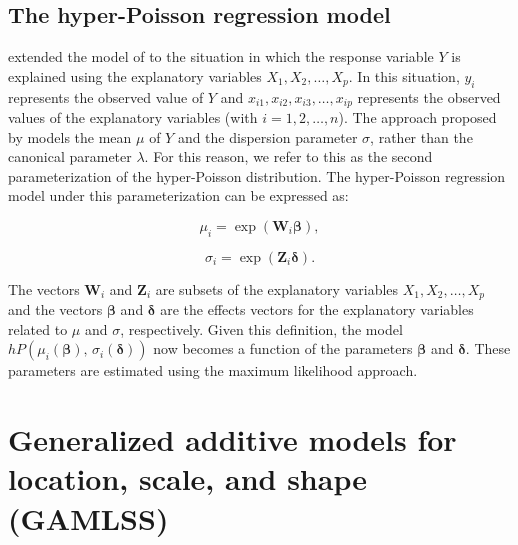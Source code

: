 \subsection{The hyper-Poisson regression model}\label{the-hyper-poisson-regression-model}

\citet{Saez13} extended the model of \citet{BardwellCrow1964} to the situation in which the response variable \(Y\) is explained using the explanatory variables \(X_1, X_2, \ldots, X_p\). In this situation, \(y_i\) represents the observed value of \(Y\) and \(x_{i1}, x_{i2}, x_{i3}, \dots, x_{ip}\) represents the observed values of the explanatory variables (with \(i=1, 2, \ldots, n\)). The approach proposed by \citet{Saez13} models the mean \(\mu\) of \(Y\) and the dispersion parameter \(\sigma\), rather than the canonical parameter \(\lambda\). For this reason, we refer to this as the second parameterization of the hyper-Poisson distribution. The hyper-Poisson regression model under this parameterization can be expressed as:

\begin{equation} 
\mu_i = \exp(\boldsymbol{W}_i \boldsymbol{\beta}),
  \label{eq:mu}
\end{equation}

\begin{equation} 
\sigma_i = \exp(\boldsymbol{Z}_i \boldsymbol{\delta}).
  \label{eq:sig}
\end{equation}

The vectors \(\boldsymbol{W}_i\) and \(\boldsymbol{Z}_i\) are subsets of the explanatory variables \(X_1, X_2, \ldots, X_p\) and the vectors \(\boldsymbol{\beta}\) and \(\boldsymbol{\delta}\) are the effects vectors for the explanatory variables related to \(\mu\) and \(\sigma\), respectively. Given this definition, the model \(hP(\mu_i(\boldsymbol{\beta}), \, \sigma_i(\boldsymbol{\delta}))\) now becomes a function of the parameters \(\boldsymbol{\beta}\) and \(\boldsymbol{\delta}\). These parameters are estimated using the maximum likelihood approach.

\section{Generalized additive models for location, scale, and shape (GAMLSS)}\label{generalized-additive-models-for-location-scale-and-shape-gamlss}

